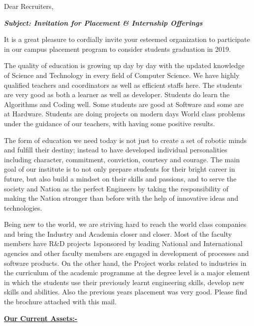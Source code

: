 \documentclass[hidelinks, 11pt, a4paper]{letter}
\begin{document}
\begin{letter}{}
\opening{Dear Recruiters,}
\begin{center}
\textit{\textbf{Subject: Invitation for Placement \& Internship Offerings}}
\end{center}

It is a great pleasure to cordially invite your esteemed organization to participate in our campus placement program to consider students graduation in 2019.

The quality of education is growing up day by day with the updated knowledge of Science and Technology in every field of Computer Science. We have highly qualified teachers and coordinators as well as efficient staffs here. The students are very good as both a learner as well as developer. Students do learn the Algorithms and Coding well. Some students are good at Software and some are at Hardware. Students are doing projects on modern days World class problems under the guidance of our teachers, with having some positive results.

The form of education we need today is not just to create a set of robotic minds and fulfill their destiny; instead to have developed individual personalities including character, commitment, conviction, courtesy and courage. The main goal of our institute is to not only prepare students for their bright career in future, but also build a mindset on their skills and passions, and to serve the society and Nation as the perfect Engineers by taking the responsibility of making the Nation stronger than before with the help of innovative ideas and technologies.

Being new to the world, we are striving hard to reach the world class companies and bring the Industry and Academia closer and closer. Most of the faculty members have R\&D projects 1sponsored by leading National and International agencies and other faculty members are engaged in development of processes and software products. On the other hand, the Project works related to industries in the curriculum of the academic programme at the degree level is a major element in which the students use their previously learnt engineering skills, develop new skills and abilities. Also the previous years placement was very good. Please find the brochure attached with this mail.

\textbf{\underline{Our Current Assets:-}}


\end{letter}
\end{document}
